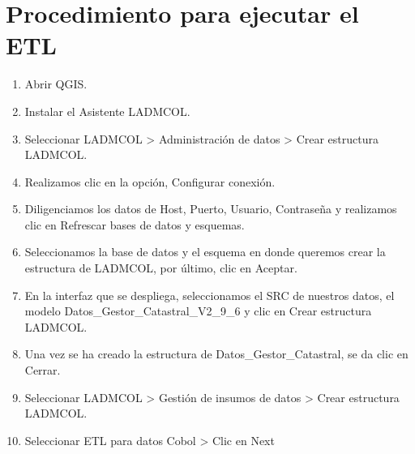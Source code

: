 \documentclass[letterpaper,10pt,spanish]{sphinxmanual}
\begin{document}
\section{Procedimiento para ejecutar el ETL}
\label{\detokenize{ETL_Cobol/Process:procedimiento-para-ejecutar-el-etl}}\label{\detokenize{ETL_Cobol/Process::doc}}\begin{enumerate}
%
\item {} 
Abrir QGIS.

\item {} 
Instalar el Asistente LADM\sphinxhyphen{}COL.

\item {} 
Seleccionar LADM\sphinxhyphen{}COL \sphinxhyphen{}\textgreater{} Administración de datos \sphinxhyphen{}\textgreater{} Crear estructura LADM\sphinxhyphen{}COL.

\item {} 
Realizamos clic en la opción, Configurar conexión.

\item {} 
Diligenciamos los datos de Host, Puerto, Usuario, Contraseña y realizamos clic en Refrescar bases de datos y esquemas.

\item {} 
Seleccionamos la base de datos y el esquema en donde queremos crear la estructura de LADM\sphinxhyphen{}COL, por último, clic en Aceptar.


\item {} 
En la interfaz que se despliega, seleccionamos el SRC de nuestros datos, el modelo Datos\_Gestor\_Catastral\_V2\_9\_6 y clic en Crear estructura LADM\sphinxhyphen{}COL.


\item {} 
Una vez se ha creado la estructura de Datos\_Gestor\_Catastral, se da clic en Cerrar.

\item {} 
Seleccionar LADM\sphinxhyphen{}COL \sphinxhyphen{}\textgreater{} Gestión de insumos de datos \sphinxhyphen{}\textgreater{} Crear estructura LADM\sphinxhyphen{}COL.

\item {} 
Seleccionar ETL para datos Cobol \sphinxhyphen{}\textgreater{} Clic en Next



\end{enumerate}
\end{document}
